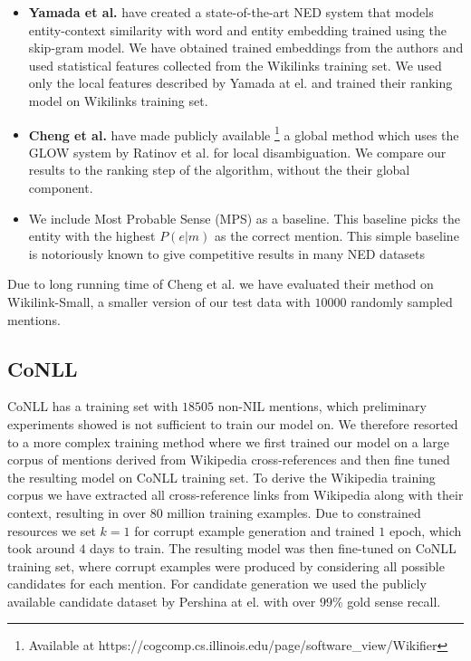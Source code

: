 \documentclass[11pt]{article}
\begin{document}
\begin{itemize} 
	\item  \textbf{Yamada et al.}  have created a state-of-the-art NED system that models entity-context similarity with word and entity embedding trained using the skip-gram model. We have obtained trained embeddings from the authors and used statistical features collected from the Wikilinks training set. We used only the local features described by Yamada at el. and trained their ranking model on Wikilinks training set.
	
	\item \textbf{Cheng et al.}  have made publicly available \footnote{Available at https://cogcomp.cs.illinois.edu/page/software\_view/Wikifier } a global method which uses the GLOW system by Ratinov et al.  for local disambiguation. We compare our results to the ranking step of the algorithm, without the their global component.
	
	\item We include Most Probable Sense (MPS) as a baseline. This baseline picks the entity with the highest $P(e|m)$ as the correct mention. This simple baseline is notoriously known to give competitive results in many NED datasets 
\end{itemize}

Due to long running time of Cheng et al. we have evaluated their method on Wikilink-Small, a smaller version of our test data with $10000$ randomly sampled mentions.

\subsection{CoNLL}

CoNLL has a training set with $18505$ non-NIL mentions, which preliminary experiments showed is not sufficient to train our model on. We therefore resorted to a more complex training method where we first trained our model on a large corpus of mentions derived from Wikipedia cross-references and then fine tuned the resulting model on CoNLL training set. To derive the Wikipedia training corpus we have extracted all cross-reference links from Wikipedia along with their context, resulting in over $80$ million training examples. Due to constrained resources we set $k=1$ for corrupt example generation and trained $1$ epoch, which took around $4$ days to train. The resulting model was then fine-tuned on CoNLL training set, where corrupt examples were produced by considering all possible candidates for each mention.
For candidate generation we used the publicly available candidate dataset by Pershina at el.  with over $99\%$ gold sense recall.
\end{document}
